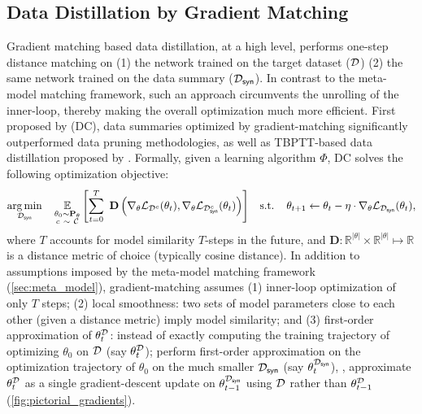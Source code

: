 \documentclass[10pt]{article} %
\begin{document}
\subsection{Data Distillation by Gradient Matching} \label{sec:grad_matching}
Gradient matching based data distillation, at a high level, performs one-step distance matching on (1) the network trained on the target dataset ($\mathcal{D}$) \vs (2) the same network trained on the data summary ($\mathcal{D}_{\mathsf{syn}}$). In contrast to the meta-model matching framework, such an approach circumvents the unrolling of the inner-loop, thereby making the overall optimization much more efficient. 
First proposed by \citet{zhao_dc} (DC), data summaries optimized by gradient-matching significantly outperformed data pruning methodologies, as well as TBPTT-based data distillation proposed by \citet{dd_orig}. Formally, given a learning algorithm $\Phi$, DC solves the following optimization objective:
\begin{equation} \label{eqn:gradient_matching}
\begin{gathered}
    \underset{\mathcal{D}_{\mathsf{syn}}}{\operatorname{arg} \operatorname{min}} \hspace{0.4cm} \underset{\substack{\theta_0 \sim \mathbf{P}_\theta\\c ~\sim~ \mathcal{C}}}{\mathbb{E}} \left[\sum_{t=0}^T ~ \mathbf{D}\left( \nabla_\theta \mathcal{L}_{\mathcal{D}^c}(\theta_t), \nabla_\theta \mathcal{L}_{\mathcal{D}_{\mathsf{syn}}^c}(\theta_t) \right)\right] \hspace{0.3cm}
    \text{s.t.} \hspace{0.4cm} \theta_{t+1} \leftarrow \theta_t - \eta \cdot \nabla_\theta \mathcal{L}_{\mathcal{D}_{\mathsf{syn}}}(\theta_t),
\end{gathered}
\end{equation}
where $T$ accounts for model similarity $T$-steps in the future, and $\mathbf{D} : \mathbb{R}^{|\theta|} \times \mathbb{R}^{|\theta|} \mapsto \mathbb{R}$ is a distance metric of choice (typically cosine distance). 
In addition to assumptions imposed by the meta-model matching framework (\cref{sec:meta_model}), gradient-matching assumes (1) inner-loop optimization of only $T$ steps; (2) local smoothness: two sets of model parameters close to each other (given a distance metric) imply model similarity; and (3) first-order approximation of $\theta_t^{\mathcal{D}}$: instead of exactly computing the training trajectory of optimizing $\theta_0$ on $\mathcal{D}$ (say $\theta_t^{\mathcal{D}}$); perform first-order approximation on the optimization trajectory of $\theta_0$ on the much smaller $\mathcal{D}_{\mathsf{syn}}$ (say $\theta_t^{\mathcal{D}_{\mathsf{syn}}}$), \ie, approximate $\theta_t^{\mathcal{D}}$ as a single gradient-descent update on $\theta_{t-1}^{\mathcal{D}_{\mathsf{syn}}}$ using $\mathcal{D}$ rather than $\theta_{t-1}^{\mathcal{D}}$ (\cref{fig:pictorial_gradients}).
\end{document}
